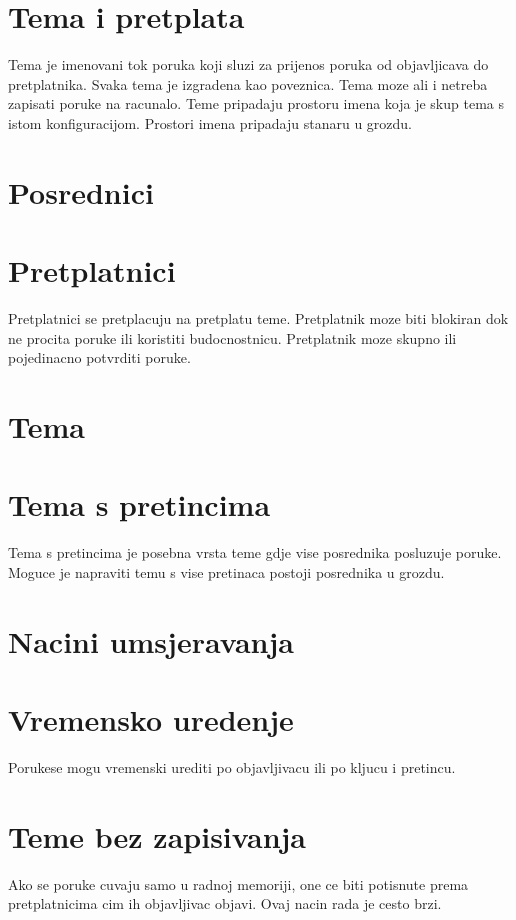 \documentclass[times, utf8, diplomski, numeric]{fer}
\begin{document}
\chapter{Tema i pretplata}
Tema je imenovani tok poruka koji sluzi za prijenos poruka od objavljicava do pretplatnika. Svaka tema je izgradena kao poveznica.   Tema moze ali i netreba zapisati poruke na racunalo. Teme pripadaju prostoru imena koja je skup tema s istom konfiguracijom. Prostori imena pripadaju stanaru u grozdu.




\chapter{Posrednici}



\chapter{Pretplatnici}
Pretplatnici se pretplacuju na pretplatu teme. Pretplatnik moze biti blokiran dok ne procita poruke ili koristiti budocnostnicu. Pretplatnik moze skupno ili pojedinacno potvrditi poruke.

\chapter{Tema}
 

\chapter{Tema s pretincima}
Tema s pretincima je posebna vrsta teme gdje vise posrednika posluzuje poruke. Moguce je napraviti temu s vise pretinaca postoji posrednika u grozdu. 

\chapter{Nacini umsjeravanja}


\chapter{Vremensko uredenje}
Porukese mogu vremenski urediti po objavljivacu ili po kljucu i pretincu.

\chapter{Teme bez zapisivanja}
Ako se poruke cuvaju samo u radnoj memoriji, one ce biti potisnute prema pretplatnicima cim ih objavljivac objavi. Ovaj nacin rada je cesto brzi.
\end{document}
